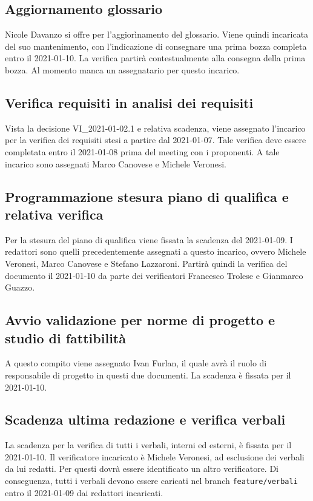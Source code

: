 \subsection{Aggiornamento glossario}
Nicole Davanzo si offre per l'aggiorìnamento del glossario. Viene quindi incaricata del suo mantenimento, con l'indicazione
di consegnare una prima bozza completa entro il 2021-01-10.
La verifica partirà contestualmente alla consegna della prima bozza. Al momento manca un assegnatario per questo incarico.

\subsection{Verifica requisiti in analisi dei requisiti}
Vista la decisione VI\_2021-01-02.1 e relativa scadenza, viene assegnato l'incarico per la verifica dei requisiti stesi
a partire dal 2021-01-07. Tale verifica deve essere completata entro il 2021-01-08 prima del meeting con i proponenti.
A tale incarico sono assegnati Marco Canovese e Michele Veronesi.

\subsection{Programmazione stesura piano di qualifica e relativa verifica}
Per la stesura del piano di qualifica viene fissata la scadenza del 2021-01-09. I redattori sono quelli precedentemente assegnati a questo
incarico, ovvero Michele Veronesi, Marco Canovese e Stefano Lazzaroni.
Partirà quindi la verifica del documento il 2021-01-10 da parte dei verificatori Francesco Trolese e Gianmarco Guazzo.

\subsection{Avvio validazione per norme di progetto e studio di fattibilità}
A questo compito viene assegnato Ivan Furlan, il quale avrà il ruolo di responsabile di progetto in questi due documenti.
La scadenza è fissata per il 2021-01-10.

\subsection{Scadenza ultima redazione e verifica verbali}
La scadenza per la verifica di tutti i verbali, interni ed esterni, è fissata per il 2021-01-10.
Il verificatore incaricato è Michele Veronesi, ad esclusione dei verbali da lui redatti. Per questi dovrà
essere identificato un altro verificatore.
Di conseguenza, tutti i verbali devono essere caricati nel branch \verb|feature/verbali| entro il 2021-01-09
dai redattori incaricati.

